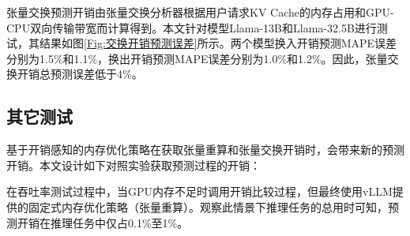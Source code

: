张量交换预测开销由张量交换分析器根据用户请求KV Cache的内存占用和GPU-CPU双向传输带宽而计算得到。本文针对模型Llama-13B和Llama-32.5B进行测试，其结果如图\ref{Fig:交换开销预测误差}所示。两个模型换入开销预测MAPE误差分别为1.5\%和1.1\%，换出开销预测MAPE误差分别为1.0\%和1.2\%。因此，张量交换开销总预测误差低于4\%。

\subsection{其它测试}

基于开销感知的内存优化策略在获取张量重算和张量交换开销时，会带来新的预测开销。本文设计如下对照实验获取预测过程的开销：

在吞吐率测试过程中，当GPU内存不足时调用开销比较过程，但最终使用vLLM提供的固定式内存优化策略（张量重算）。观察此情景下推理任务的总用时可知，预测开销在推理任务中仅占0.1\%至1\%。


